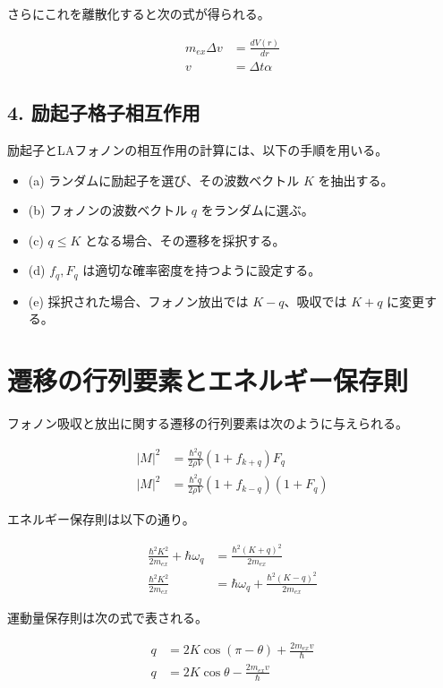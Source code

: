 さらにこれを離散化すると次の式が得られる。

\begin{align}
    m_{ex} \Delta v &= \frac{dV(r)}{dr} \tag{7.67} \\
    v &= \Delta t \alpha \tag{7.68}
\end{align}

\subsection{4. 励起子格子相互作用}
励起子とLAフォノンの相互作用の計算には、以下の手順を用いる。

\begin{itemize}
    \item (a) ランダムに励起子を選び、その波数ベクトル $K$ を抽出する。
    \item (b) フォノンの波数ベクトル $q$ をランダムに選ぶ。
    \item (c) $q \leq K$ となる場合、その遷移を採択する。
    \item (d) $f_q, F_q$ は適切な確率密度を持つように設定する。
    \item (e) 採択された場合、フォノン放出では $K - q$、吸収では $K + q$ に変更する。
\end{itemize}

\section{遷移の行列要素とエネルギー保存則}

フォノン吸収と放出に関する遷移の行列要素は次のように与えられる。

\begin{align}
    |M|^2 &= \frac{\hbar^2 q}{2 \rho V} (1 + f_{k+q}) F_q \tag{7.69} \\
    |M|^2 &= \frac{\hbar^2 q}{2 \rho V} (1 + f_{k-q}) (1 + F_q) \tag{7.70}
\end{align}

エネルギー保存則は以下の通り。

\begin{align}
    \frac{\hbar^2 K^2}{2 m_{ex}} + \hbar \omega_q &= \frac{\hbar^2 (K + q)^2}{2 m_{ex}} \tag{7.71} \\
    \frac{\hbar^2 K^2}{2 m_{ex}} &= \hbar \omega_q + \frac{\hbar^2 (K - q)^2}{2 m_{ex}} \tag{7.72}
\end{align}

運動量保存則は次の式で表される。

\begin{align}
    q &= 2K \cos (\pi - \theta) + \frac{2 m_{ex} v}{\hbar} \tag{7.73} \\
    q &= 2K \cos \theta - \frac{2 m_{ex} v}{\hbar} \tag{7.74}
\end{align}

